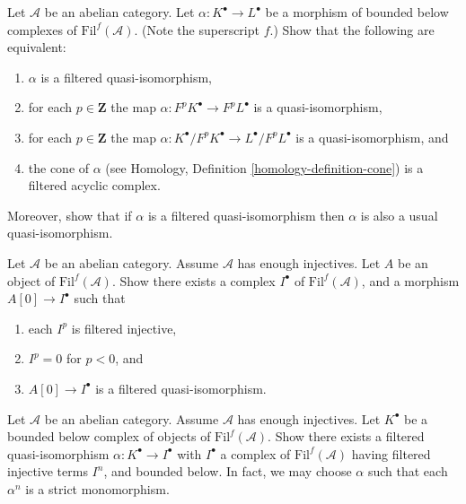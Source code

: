 \begin{exercise}
\label{exercise-filtered-quasi-isomorphism}
Let $\mathcal{A}$ be an abelian category.
Let $\alpha : K^\bullet \to L^\bullet$ be a morphism of bounded below
complexes of $\text{Fil}^f(\mathcal{A})$. (Note the superscript $f$.)
Show that the following are equivalent:
\begin{enumerate}
\item $\alpha$ is a filtered quasi-isomorphism,
\item for each $p \in \mathbf{Z}$ the map
$\alpha : F^pK^\bullet \to F^pL^\bullet$ is a quasi-isomorphism,
\item for each $p \in \mathbf{Z}$ the map
$\alpha : K^\bullet/F^pK^\bullet \to L^\bullet/F^pL^\bullet$
is a quasi-isomorphism, and
\item the cone of $\alpha$ (see
Homology, Definition \ref{homology-definition-cone})
is a filtered acyclic complex.
\end{enumerate}
Moreover, show that if $\alpha$ is a filtered quasi-isomorphism
then $\alpha$ is also a usual quasi-isomorphism.
\end{exercise}

\begin{exercise}
\label{exercise-injective-resolution}
Let $\mathcal{A}$ be an abelian category.
Assume $\mathcal{A}$ has enough injectives.
Let $A$ be an object of $\text{Fil}^f(\mathcal{A})$.
Show there exists a complex
$I^\bullet$ of $\text{Fil}^f(\mathcal{A})$,
and a morphism $A[0] \to I^\bullet$ such that
\begin{enumerate}
\item each $I^p$ is filtered injective,
\item $I^p = 0$ for $p < 0$, and
\item $A[0] \to I^\bullet$ is a filtered quasi-isomorphism.
\end{enumerate}
\end{exercise}

\begin{exercise}
\label{exercise-injective-resolution-complex}
Let $\mathcal{A}$ be an abelian category.
Assume $\mathcal{A}$ has enough injectives.
Let $K^\bullet$ be a bounded below complex of objects of
$\text{Fil}^f(\mathcal{A})$. Show there exists a
filtered quasi-isomorphism $\alpha : K^\bullet \to I^\bullet$
with $I^\bullet$ a complex of $\text{Fil}^f(\mathcal{A})$
having filtered injective terms $I^n$, and bounded below.
In fact, we may choose $\alpha$ such that each $\alpha^n$ is
a strict monomorphism.
\end{exercise}

